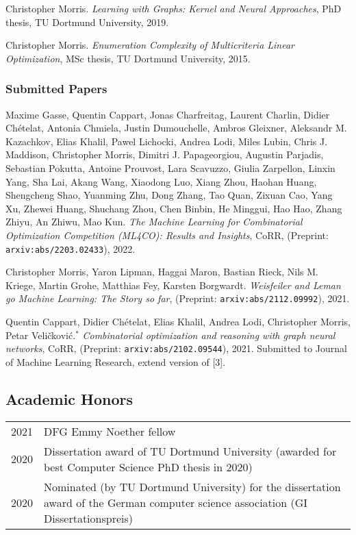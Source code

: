 \documentclass[11pt, a4paper, DIV=12]{scrartcl}
\begin{document}
\begin{thebibliography}{5}
Christopher Morris.
\emph{Learning with Graphs: Kernel and Neural Approaches}, PhD thesis, TU Dortmund University, 2019.

Christopher Morris.
\emph{Enumeration Complexity of Multicriteria Linear Optimization}, MSc thesis, TU Dortmund University, 2015.
	
\subsubsection*{Submitted Papers}


Maxime Gasse, Quentin Cappart, Jonas Charfreitag, Laurent Charlin, Didier Chételat, Antonia Chmiela, Justin Dumouchelle, Ambros Gleixner, Aleksandr M. Kazachkov, Elias Khalil, Pawel Lichocki, Andrea Lodi, Miles Lubin, Chris J. Maddison, Christopher Morris, Dimitri J. Papageorgiou, Augustin Parjadis, Sebastian Pokutta, Antoine Prouvost, Lara Scavuzzo, Giulia Zarpellon, Linxin Yang, Sha Lai, Akang Wang, Xiaodong Luo, Xiang Zhou, Haohan Huang, Shengcheng Shao, Yuanming Zhu, Dong Zhang, Tao Quan, Zixuan Cao, Yang Xu, Zhewei Huang, Shuchang Zhou, Chen Binbin, He Minggui, Hao Hao, Zhang Zhiyu, An Zhiwu, Mao Kun.
\emph{The Machine Learning for Combinatorial Optimization Competition (ML4CO): Results and Insights},
CoRR, (Preprint: \texttt{arxiv:abs/2203.02433}), 2022. 

Christopher Morris, Yaron Lipman, Haggai Maron, Bastian Rieck, Nils M. Kriege, Martin Grohe, Matthias Fey, Karsten Borgwardt.
\emph{Weisfeiler and Leman go Machine Learning: The Story so far}, (Preprint: \texttt{arxiv:abs/2112.09992}), 2021. 

Quentin Cappart, Didier Chételat, Elias Khalil, Andrea Lodi, Christopher Morris, Petar Veli\v{c}kovi\'{c}.$^*$
\emph{Combinatorial optimization and reasoning with graph neural networks},
CoRR, (Preprint: \texttt{arxiv:abs/2102.09544}), 2021. Submitted to Journal of Machine Learning Research, extend version of [3].
\end{thebibliography}

\subsection*{Academic Honors}
\begin{tabular}{p{2.1cm}p{12.0cm}}
	2021& DFG Emmy Noether fellow\\
	2020& Dissertation award of TU Dortmund University (awarded for best Computer Science PhD thesis in 2020)\\
	2020& Nominated (by TU Dortmund University) for the dissertation award of the German computer science association (GI Dissertationspreis)\\
\end{tabular}
\end{document}
